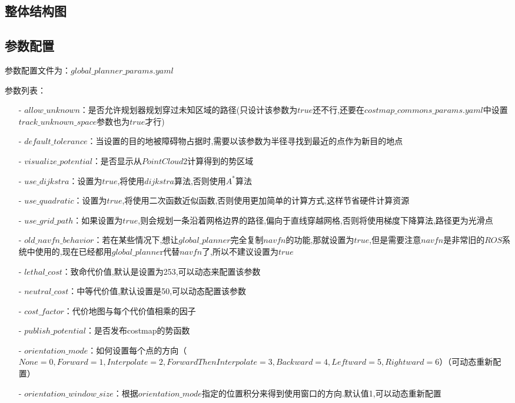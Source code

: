 \documentclass[9pt, oneside]{book}
\begin{document}
\subsection{整体结构图}


\subsection{参数配置}

参数配置文件为：$global\_planner\_params.yaml$

参数列表：

\begin{itemize}
    \item [-] $allow\_unknown$：是否允许规划器规划穿过未知区域的路径(只设计该参数为$true$还不行,还要在$costmap\_commons\_params.yaml$中设置$track\_unknown\_space$参数也为$true$才行)
    \item [-] $default\_tolerance$：当设置的目的地被障碍物占据时,需要以该参数为半径寻找到最近的点作为新目的地点
    \item [-] $visualize\_potential$：是否显示从$PointCloud2$计算得到的势区域
    \item [-] $use\_dijkstra$：设置为$true$,将使用$dijkstra$算法,否则使用$A^*$算法
    \item [-] $use\_quadratic$：设置为$true$,将使用二次函数近似函数,否则使用更加简单的计算方式,这样节省硬件计算资源
    \item [-] $use\_grid\_path$：如果设置为$true$,则会规划一条沿着网格边界的路径,偏向于直线穿越网格,否则将使用梯度下降算法,路径更为光滑点
    \item [-] $old\_navfn\_behavior$：若在某些情况下,想让$global\_planner$完全复制$navfn$的功能,那就设置为$true$,但是需要注意$navfn$是非常旧的$ROS$系统中使用的,现在已经都用$global\_planne$r代替$navfn$了,所以不建议设置为$true$
    \item [-] $lethal\_cost$：致命代价值,默认是设置为253,可以动态来配置该参数
    \item [-] $neutral\_cost$：中等代价值,默认设置是50,可以动态配置该参数
    \item [-] $cost\_factor$：代价地图与每个代价值相乘的因子
    \item [-] $publish\_potential$：是否发布costmap的势函数
    \item [-] $orientation\_mode$：如何设置每个点的方向（$None = 0,Forward = 1,Interpolate = 2,ForwardThenInterpolate = 3,Backward = 4,Leftward = 5,Rightward = 6$）（可动态重新配置）
    \item [-] $orientation\_window\_size$：根据$orientation\_mode$指定的位置积分来得到使用窗口的方向.默认值1,可以动态重新配置
\end{itemize}
\end{document}
